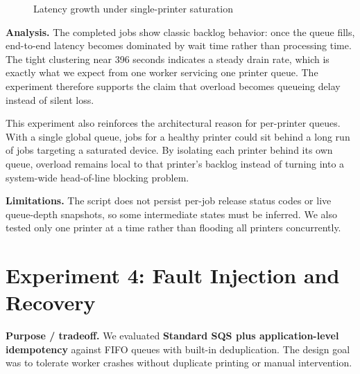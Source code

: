 \documentclass[10pt,letterpaper]{article}
\begin{document}
\begin{figure}[H]
\centering
{}
\caption{Latency growth under single-printer saturation}
\end{figure}

\begin{resultbox}
\textbf{Analysis.} The completed jobs show classic backlog behavior: once the queue fills, end-to-end latency becomes dominated by wait time rather than processing time. The tight clustering near 396 seconds indicates a steady drain rate, which is exactly what we expect from one worker servicing one printer queue. The experiment therefore supports the claim that overload becomes queueing delay instead of silent loss.

This experiment also reinforces the architectural reason for per-printer queues. With a single global queue, jobs for a healthy printer could sit behind a long run of jobs targeting a saturated device. By isolating each printer behind its own queue, overload remains local to that printer's backlog instead of turning into a system-wide head-of-line blocking problem.
\end{resultbox}

\begin{limitbox}
\textbf{Limitations.} The script does not persist per-job release status codes or live queue-depth snapshots, so some intermediate states must be inferred. We also tested only one printer at a time rather than flooding all printers concurrently.
\end{limitbox}

\section*{Experiment 4: Fault Injection and Recovery}
\begin{claimbox}
\textbf{Purpose / tradeoff.} We evaluated \textbf{Standard SQS plus application-level idempotency} against FIFO queues with built-in deduplication. The design goal was to tolerate worker crashes without duplicate printing or manual intervention.
\end{claimbox}
\end{document}
